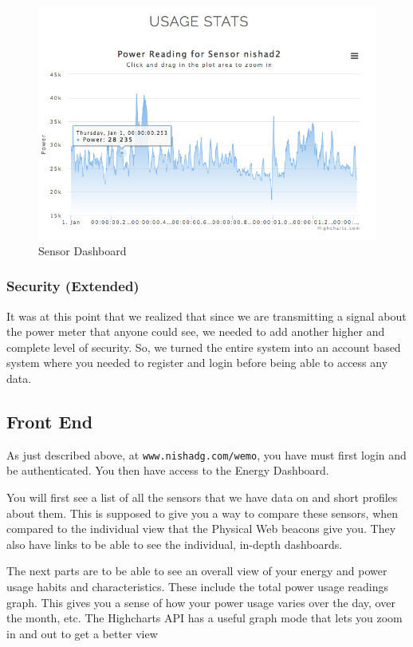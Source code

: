 \documentclass{sig-alternate-05-2015}
\begin{document}
\begin{figure}
	\centering
	\includegraphics[scale=.27]{phys2}
	\caption{Sensor Dashboard}
\end{figure}

\subsubsection{Security (Extended)}
It was at this point that we realized that since we are transmitting a signal about the power meter that anyone could see, we needed to add another higher and complete level of security. So, we turned the entire system into an account based system where you needed to register and login before being able to access any data.

\subsection{Front End}

As just described above, at \texttt{www.nishadg.com/wemo}, you have must first login and be authenticated. You then have access to the Energy Dashboard.

You will first see a list of all the sensors that we have data on and short profiles about them. This is supposed to give you a way to compare these sensors, when compared to the individual view that the Physical Web beacons give you. They also have links to be able to see the individual, in-depth dashboards.

The next parts are to be able to see an overall view of your energy and power usage habits and characteristics. These include the total power usage readings graph. This gives you a sense of how your power usage varies over the day, over the month, etc. The Highcharts API has a useful graph mode that lets you zoom in and out to get a better view
\end{document}
